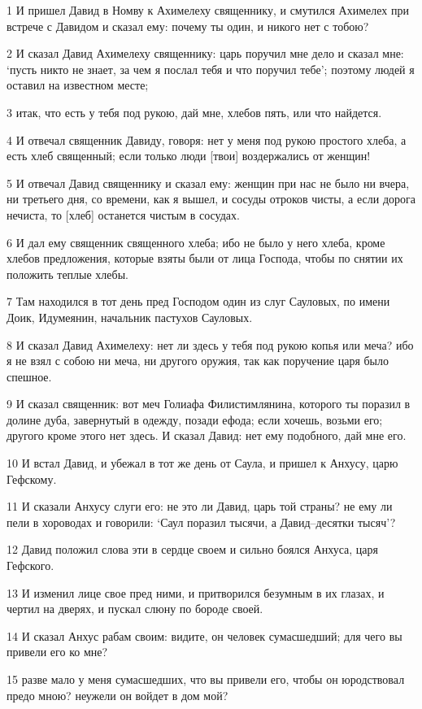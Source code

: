 \par 1 И пришел Давид в Номву к Ахимелеху священнику, и смутился Ахимелех при встрече с Давидом и сказал ему: почему ты один, и никого нет с тобою?
\par 2 И сказал Давид Ахимелеху священнику: царь поручил мне дело и сказал мне: `пусть никто не знает, за чем я послал тебя и что поручил тебе'; поэтому людей я оставил на известном месте;
\par 3 итак, что есть у тебя под рукою, дай мне, хлебов пять, или что найдется.
\par 4 И отвечал священник Давиду, говоря: нет у меня под рукою простого хлеба, а есть хлеб священный; если только люди [твои] воздержались от женщин!
\par 5 И отвечал Давид священнику и сказал ему: женщин при нас не было ни вчера, ни третьего дня, со времени, как я вышел, и сосуды отроков чисты, а если дорога нечиста, то [хлеб] останется чистым в сосудах.
\par 6 И дал ему священник священного хлеба; ибо не было у него хлеба, кроме хлебов предложения, которые взяты были от лица Господа, чтобы по снятии их положить теплые хлебы.
\par 7 Там находился в тот день пред Господом один из слуг Сауловых, по имени Доик, Идумеянин, начальник пастухов Сауловых.
\par 8 И сказал Давид Ахимелеху: нет ли здесь у тебя под рукою копья или меча? ибо я не взял с собою ни меча, ни другого оружия, так как поручение царя было спешное.
\par 9 И сказал священник: вот меч Голиафа Филистимлянина, которого ты поразил в долине дуба, завернутый в одежду, позади ефода; если хочешь, возьми его; другого кроме этого нет здесь. И сказал Давид: нет ему подобного, дай мне его.
\par 10 И встал Давид, и убежал в тот же день от Саула, и пришел к Анхусу, царю Гефскому.
\par 11 И сказали Анхусу слуги его: не это ли Давид, царь той страны? не ему ли пели в хороводах и говорили: `Саул поразил тысячи, а Давид--десятки тысяч'?
\par 12 Давид положил слова эти в сердце своем и сильно боялся Анхуса, царя Гефского.
\par 13 И изменил лице свое пред ними, и притворился безумным в их глазах, и чертил на дверях, и пускал слюну по бороде своей.
\par 14 И сказал Анхус рабам своим: видите, он человек сумасшедший; для чего вы привели его ко мне?
\par 15 разве мало у меня сумасшедших, что вы привели его, чтобы он юродствовал предо мною? неужели он войдет в дом мой?


